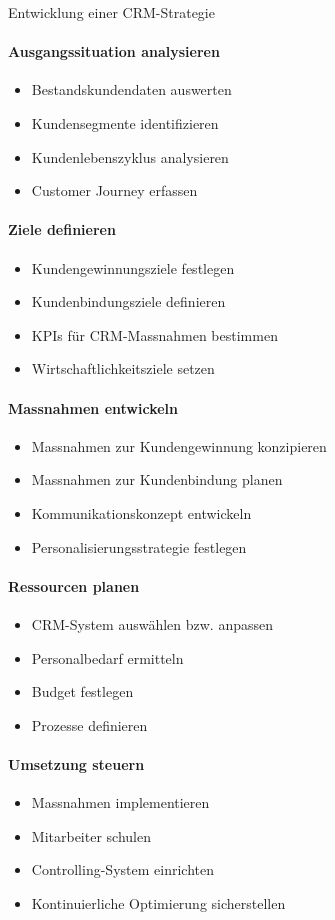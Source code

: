 \begin{KR}{Entwicklung einer CRM-Strategie}\\
\paragraph{Ausgangssituation analysieren}
\begin{itemize}
    \item Bestandskundendaten auswerten
    \item Kundensegmente identifizieren
    \item Kundenlebenszyklus analysieren
    \item Customer Journey erfassen
\end{itemize}

\paragraph{Ziele definieren}
\begin{itemize}
    \item Kundengewinnungsziele festlegen
    \item Kundenbindungsziele definieren
    \item KPIs für CRM-Massnahmen bestimmen
    \item Wirtschaftlichkeitsziele setzen
\end{itemize}

\paragraph{Massnahmen entwickeln}
\begin{itemize}
    \item Massnahmen zur Kundengewinnung konzipieren
    \item Massnahmen zur Kundenbindung planen
    \item Kommunikationskonzept entwickeln
    \item Personalisierungsstrategie festlegen
\end{itemize}

\paragraph{Ressourcen planen}
\begin{itemize}
    \item CRM-System auswählen bzw. anpassen
    \item Personalbedarf ermitteln
    \item Budget festlegen
    \item Prozesse definieren
\end{itemize}

\paragraph{Umsetzung steuern}
\begin{itemize}
    \item Massnahmen implementieren
    \item Mitarbeiter schulen
    \item Controlling-System einrichten
    \item Kontinuierliche Optimierung sicherstellen
\end{itemize}
\end{KR}

